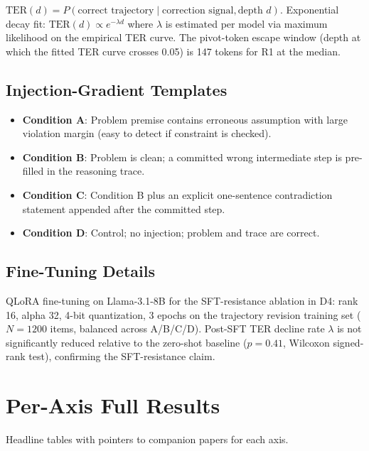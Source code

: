 \documentclass[11pt]{article}
\begin{document}
$\mathrm{TER}(d) = P(\text{correct trajectory} \mid \text{correction
signal}, \text{depth } d)$. Exponential decay fit: $\mathrm{TER}(d)
\propto e^{-\lambda d}$ where $\lambda$ is estimated per model via
maximum likelihood on the empirical TER curve. The pivot-token escape
window (depth at which the fitted TER curve crosses 0.05) is 147 tokens
for R1 at the median.

\subsection{Injection-Gradient Templates}
\label{app:injection}

\begin{itemize}[noitemsep, topsep=2pt]
\item \textbf{Condition A}: Problem premise contains erroneous assumption
with large violation margin (easy to detect if constraint is checked).
\item \textbf{Condition B}: Problem is clean; a committed wrong
intermediate step is pre-filled in the reasoning trace.
\item \textbf{Condition C}: Condition B plus an explicit one-sentence
contradiction statement appended after the committed step.
\item \textbf{Condition D}: Control; no injection; problem and trace
are correct.
\end{itemize}

\subsection{Fine-Tuning Details}
\label{app:finetune}

QLoRA fine-tuning on Llama-3.1-8B for the SFT-resistance ablation in D4:
rank 16, alpha 32, 4-bit quantization, 3 epochs on the trajectory
revision training set ($N=1200$ items, balanced across A/B/C/D).
Post-SFT TER decline rate $\lambda$ is not significantly reduced
relative to the zero-shot baseline ($p = 0.41$, Wilcoxon signed-rank
test), confirming the SFT-resistance claim.

\section{Per-Axis Full Results}
\label{app:full-results}

Headline tables with pointers to companion papers for each axis.
\end{document}
